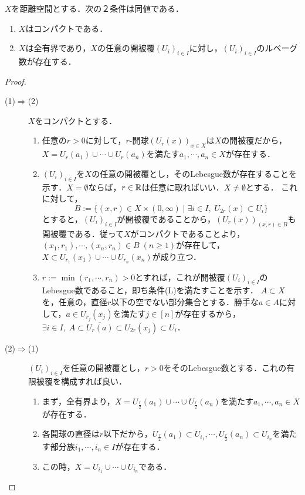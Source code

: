 \documentclass[uplatex,dvipdfmx]{jsreport}
\begin{document}
\begin{proposition}[距離空間がコンパクトであることの特徴付け]\label{prop-距離空間がコンパクトであることの特徴付け}
    $X$を距離空間とする．次の２条件は同値である．
    \begin{enumerate}
        \item $X$はコンパクトである．
        \item $X$は全有界であり，$X$の任意の開被覆$(U_i)_{i\in I}$に対し，$(U_i)_{i\in I}$のルベーグ数が存在する．
    \end{enumerate}
\end{proposition}
\begin{proof}\mbox{}
    \begin{description}
        \item[(1)$\Rightarrow$(2)] $X$をコンパクトとする．
        \begin{enumerate}
            \item 任意の$r>0$に対して，$r$-開球$(U_r(x))_{x\in X}$は$X$の開被覆だから，$X=U_r(a_1)\cup\cdots\cup U_r(a_n)$を満たす$a_1,\cdots,a_n\in X$が存在する．
            \item $(U_i)_{i\in I}$を$X$の任意の開被覆とし，そのLebesgue数が存在することを示す．$X=\emptyset$ならば，$r\in\mathbb{R}$は任意に取ればいい．$X\ne\emptyset$とする．
            これに対して，\[B:=\{(x,r)\in X\times(0,\infty)\mid \exists i\in I,\;U_{2r}(x)\subset U_i\}\]
            とすると，$(U_i)_{i\in I}$が開被覆であることから，$(U_r(x))_{(x,r)\in B}$も開被覆である．従って$X$がコンパクトであることより，$(x_1,r_1),\cdots,(x_n,r_n)\in B\;(n\ge 1)$が存在して，$X\subset U_{r_1}(x_1)\cup\cdots\cup U_{r_n}(x_n)$が成り立つ．
            \item $r:=\min(r_1,\cdots,r_n)>0$とすれば，これが開被覆$(U_i)_{i\in I}$のLebesgue数であること，即ち条件(L)を満たすことを示す．
            $A\subset X$を，任意の，直径$r$以下の空でない部分集合とする．勝手な$a\in A$に対して，$a\in U_{r_j}(x_j)$を満たす$j\in[n]$が存在するから，$\exists i\in I,\;A\subset\overline{U_r(a)}\subset U_{2r}(x_j)\subset U_i$．
        \end{enumerate}
        \item[(2)$\Rightarrow$(1)]
        $(U_i)_{i\in I}$を任意の開被覆とし，$r>0$をそのLebesgue数とする．これの有限被覆を構成すれば良い．
        \begin{enumerate}
            \item まず，全有界より，$X=U_{\frac{r}{2}}(a_1)\cup\cdots\cup U_{\frac{r}{2}}(a_n)$を満たす$a_1,\cdots,a_n\in X$が存在する．
            \item 各開球の直径は$r$以下だから，$U_{\frac{r}{2}}(a_1)\subset U_{i_1},\cdots,U_{\frac{r}{2}}(a_n)\subset U_{i_n}$を満たす部分族$i_1,\cdots,i_n\in I$が存在する．
            \item この時，$X=U_{i_1}\cup\cdots\cup U_{i_n}$である．
        \end{enumerate}
    \end{description}
\end{proof}
\end{document}
